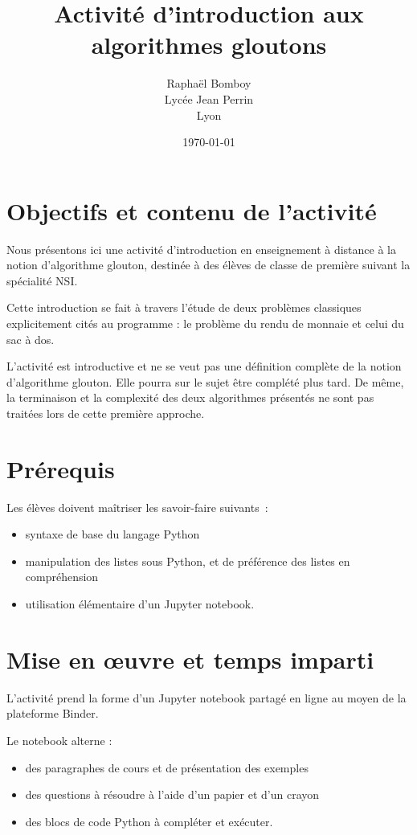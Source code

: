 \documentclass[11pt]{article}
\title{Activité d'introduction aux algorithmes gloutons}
\author{Raphaël Bomboy\\
   Lycée Jean Perrin\\
   Lyon}
\date{\today}
\theoremstyle{plain}
\theoremstyle{definition}
\theoremstyle{remark}
\theoremstyle{exercice}
\begin{document}
\maketitle

\section{Objectifs et contenu de l'activité}

Nous présentons ici une activité d'introduction en enseignement à distance à la notion d’algorithme glouton, destinée à des élèves de classe de première suivant la spécialité NSI.

\medskip

 Cette introduction se fait à travers l'étude de deux problèmes classiques explicitement cités au programme : le problème du rendu de monnaie et celui du sac à dos.
 
\medskip
 
L'activité est introductive et ne se veut pas une définition complète de la notion d'algorithme glouton. Elle pourra sur le sujet être complété plus tard. De même, la terminaison et la complexité des deux algorithmes présentés ne sont pas traitées lors de cette première approche.

\section{Prérequis}

Les élèves doivent maîtriser les savoir-faire suivants~:

\begin{itemize}
	\item syntaxe de base du langage Python
	\item manipulation des listes sous Python, et de préférence des listes en compréhension
	\item utilisation élémentaire d'un Jupyter notebook.
\end{itemize}

\section{Mise en œuvre et temps imparti}

L'activité prend la forme d'un Jupyter notebook partagé en ligne au moyen de la plateforme Binder.

\medskip

Le notebook alterne :

\begin{itemize}
	\item des paragraphes de cours et de présentation des exemples
	\item des questions à résoudre à l'aide d'un papier et d'un crayon
	\item des blocs de code Python à compléter et exécuter.
\end{itemize}
\end{document}
